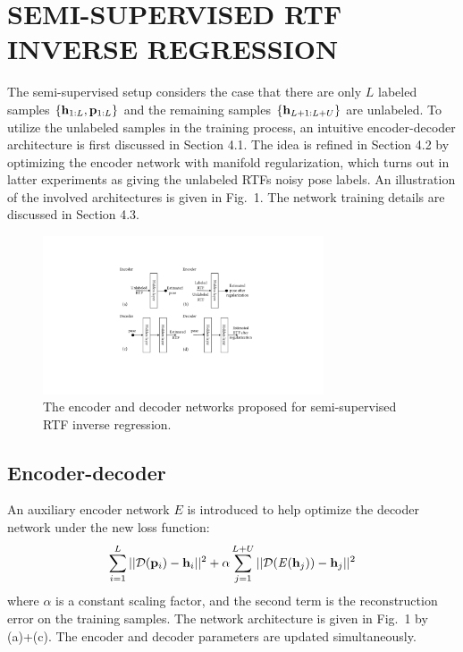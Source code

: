 \documentclass{article}
\begin{document}
\section{SEMI-SUPERVISED RTF INVERSE REGRESSION}

The semi-supervised setup considers the case that there are only $L$ labeled samples $\{{\bf h}_{1:L}, {\bf p}_{1:L}\}$ and the remaining samples $\{{\bf h}_{L+1:L+U}\}$ are unlabeled. To utilize the unlabeled samples in the training process, an intuitive encoder-decoder architecture is first discussed in Section 4.1. The idea is refined in Section 4.2 by optimizing the encoder network with manifold regularization, which turns out in latter experiments as giving the unlabeled RTFs noisy pose labels. An illustration of the involved architectures is given in Fig.~1. The network training details are discussed in Section 4.3.


\begin{figure}[tb]
    \centering
    \centerline{\includegraphics[width=8.3cm]{fig1_nn.pdf}}
    \caption{The encoder and decoder networks proposed for semi-supervised RTF inverse regression.}
    \label{fig1}
\end{figure}

\subsection{Encoder-decoder}

An auxiliary encoder network $\mathit{E}$ is introduced to help optimize the decoder network under the new loss function:
\begin{equation}\label{eq:lossed}
\sum_{i=1}^{L}||\mathcal{D}({\bf p}_i)-{\bf h}_i||^2 + \alpha \sum_{j=1}^{L+U}||\mathcal{D}(\mathit{E}({\bf h}_j))-{\bf h}_j||^2
\end{equation}
where $\alpha$ is a constant scaling factor, and the second term is the reconstruction error on the training samples. The network architecture is given in Fig.~1 by (a)+(c). The encoder and decoder parameters are updated simultaneously.
\end{document}
